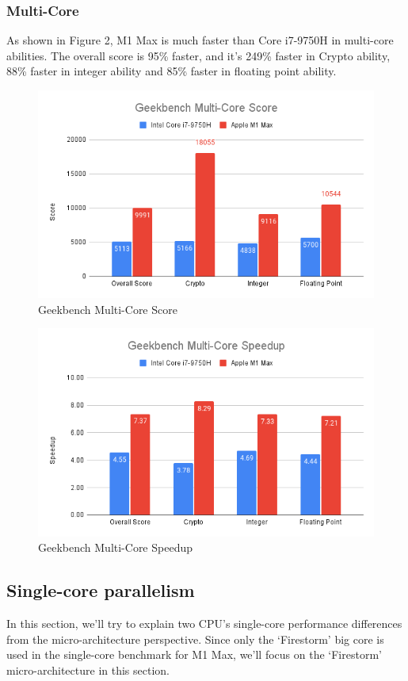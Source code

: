 \documentclass[11pt]{article}
\begin{document}
\subsubsection*{Multi-Core}
As shown in Figure 2, M1 Max is much faster than Core i7-9750H in multi-core abilities. The overall score is 95\% faster, and it’s 249\% faster in Crypto ability, 88\% faster in integer ability and 85\% faster in floating point ability. 
\begin{figure}[h]
    \centering
    \includegraphics[scale = 0.8]{Geekbench Multi-Core Score.png}
    \caption{Geekbench Multi-Core Score}
	\label{fig:Geekbench Multi-Core Score}
\end{figure}
\begin{figure}[h]
    \centering
    \includegraphics[scale = 0.8]{Geekbench Multi-Core Speedup.png}
    \caption{Geekbench Multi-Core Speedup}
	\label{fig:Geekbench Multi-Core Speedup}
\end{figure}
\subsection*{Single-core parallelism}
In this section, we’ll try to explain two CPU’s single-core performance differences from the micro-architecture perspective. Since only the ‘Firestorm’ big core is used in the single-core benchmark for M1 Max, we’ll focus on the ‘Firestorm’ micro-architecture in this section.
\end{document}
